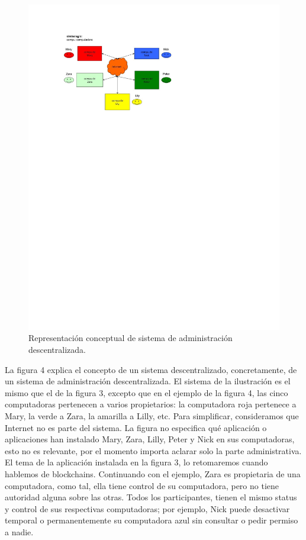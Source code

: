 \documentclass[12pt]{report} %
\begin{document}
\begin{itemize}
\begin{figure}
\centering
\includegraphics[width=0.85\columnwidth]{imagenes/imagendesc4.pdf}
\caption{Representación conceptual de sistema de administración descentralizada.}
\label{fig:imagendesc4}
\end{figure} 


La figura 4 explica el concepto de un sistema descentralizado, concretamente, de un sistema de administración descentralizada. El sistema de la ilustración es el mismo que el de la figura 3, excepto que en el ejemplo de la figura 4, las cinco computadoras pertenecen a varios propietarios: la computadora roja pertenece a Mary, la verde a Zara, la amarilla a Lilly, etc.  Para simplificar, consideramos que Internet no es parte del sistema. La figura no especifica qué aplicación o aplicaciones han instalado Mary, Zara, Lilly, Peter y Nick en sus computadoras, esto no es relevante, por el momento importa aclarar solo la parte administrativa. El tema de la aplicación instalada en la figura 3, lo retomaremos cuando hablemos de blockchains. Continuando con el ejemplo, Zara es propietaria de una computadora, como tal, ella tiene control de su computadora, pero no tiene autoridad alguna sobre las otras. Todos los participantes, tienen el mismo status y control de sus respectivas computadoras; por ejemplo, Nick puede desactivar temporal o permanentemente su computadora azul sin consultar o pedir permiso a nadie. 


\end{itemize}
\end{document}
